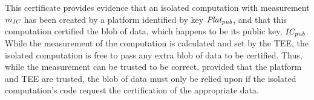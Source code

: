 This certificate provides evidence that an isolated computation with measurement $m_{\textit{IC}{}}$ has been created by a platform identified by key $\textit{Plat}_{\textit{pub}{}}$, and that this computation certified the blob of data, which happens to be its public key, $\textit{IC}{}_{\textit{pub}{}}$. While the measurement of the computation is calculated and set by the TEE, the isolated computation is free to pass any extra blob of data to be certified. Thus, while the measurement can be trusted to be correct, provided that the platform and TEE are trusted, the blob of data must only be relied upon if the isolated computation's code request the certification of the appropriate data.



%




